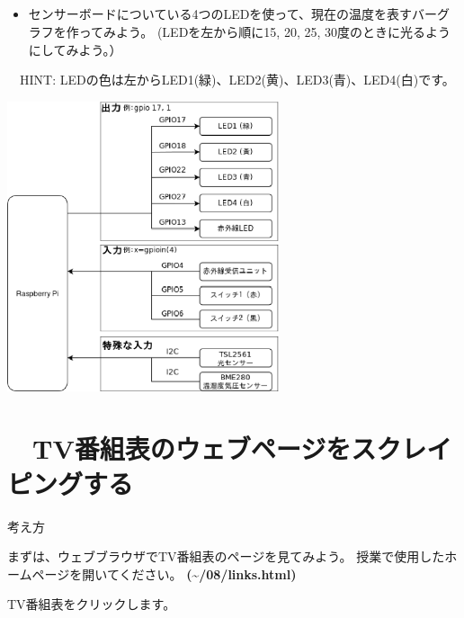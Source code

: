 \bigskip


\subsection*{\theQuestion\label{Q:amedas8}}
\begin{itemize}
\item
センサーボードについている4つのLEDを使って、現在の温度を表すバーグラフを作ってみよう。
		(LEDを左から順に15,
20, 25,
30度のときに光るようにしてみよう。）
\end{itemize}
\ \ HINT:
LEDの色は左からLED1(緑)、LED2(黄)、LED3(青)、LED4(白)です。

\begin{center}
\includegraphics[width=0.6\textwidth]{./text08-img/textbook-img040.eps}

\end{center}


\bigskip


\clearpage\section*{\theExercise　TV番組表のウェブページをスクレイピングする}
\addtocounter{Exercise}{-1}\label{E:TV}
考え方

まずは、ウェブブラウザでTV番組表のページを見てみよう。
授業で使用したホームページを開いてください。
\textbf{({\textasciitilde}/08/links.html)}

TV番組表をクリックします。



